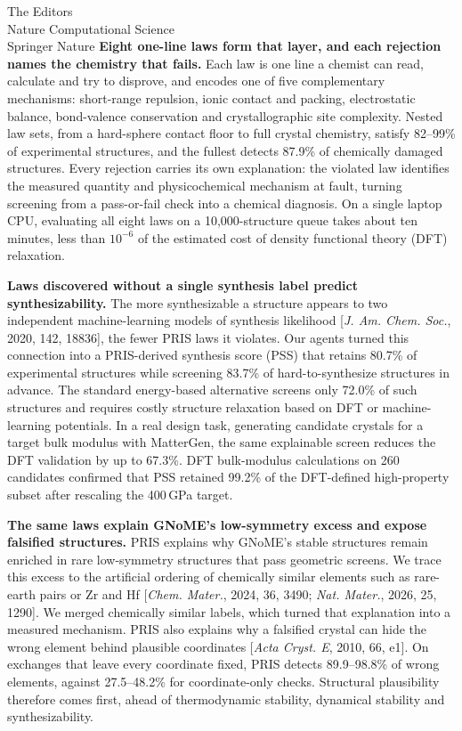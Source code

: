 \documentclass[11pt,a4paper]{letter}
\begin{document}
\begin{letter}{The Editors\\Nature Computational Science\\Springer Nature}
\textbf{Eight one-line laws form that layer, and each rejection names the chemistry that fails.}
Each law is one line a chemist can read, calculate and try to disprove, and encodes one of five complementary mechanisms: short-range repulsion, ionic contact and packing, electrostatic balance, bond-valence conservation and crystallographic site complexity. Nested law sets, from a hard-sphere contact floor to full crystal chemistry, satisfy 82--99\% of experimental structures, and the fullest detects 87.9\% of chemically damaged structures. Every rejection carries its own explanation: the violated law identifies the measured quantity and physicochemical mechanism at fault, turning screening from a pass-or-fail check into a chemical diagnosis. On a single laptop CPU, evaluating all eight laws on a 10{,}000-structure queue takes about ten minutes, less than $10^{-6}$ of the estimated cost of density functional theory (DFT) relaxation.

\textbf{Laws discovered without a single synthesis label predict synthesizability.}
The more synthesizable a structure appears to two independent machine-learning models of synthesis likelihood [\emph{J. Am. Chem. Soc.}, 2020, 142, 18836], the fewer PRIS laws it violates. Our agents turned this connection into a PRIS-derived synthesis score (PSS) that retains 80.7\% of experimental structures while screening 83.7\% of hard-to-synthesize structures in advance. The standard energy-based alternative screens only 72.0\% of such structures and requires costly structure relaxation based on DFT or machine-learning potentials. In a real design task, generating candidate crystals for a target bulk modulus with MatterGen, the same explainable screen reduces the DFT validation by up to 67.3\%. DFT bulk-modulus calculations on 260 candidates confirmed that PSS retained 99.2\% of the DFT-defined high-property subset after rescaling the 400\,GPa target.

\textbf{The same laws explain GNoME's low-symmetry excess and expose falsified structures.} PRIS explains why GNoME's stable structures remain enriched in rare low-symmetry structures that pass geometric screens. We trace this excess to the artificial ordering of chemically similar elements such as rare-earth pairs or Zr and Hf [\emph{Chem. Mater.}, 2024, 36, 3490; \emph{Nat. Mater.}, 2026, 25, 1290]. We merged chemically similar labels, which turned that explanation into a measured mechanism. PRIS also explains why a falsified crystal can hide the wrong element behind plausible coordinates [\emph{Acta Cryst. E}, 2010, 66, e1]. On exchanges that leave every coordinate fixed, PRIS detects 89.9--98.8\% of wrong elements, against 27.5--48.2\% for coordinate-only checks. Structural plausibility therefore comes first, ahead of thermodynamic stability, dynamical stability and synthesizability.


\end{letter}
\end{document}
